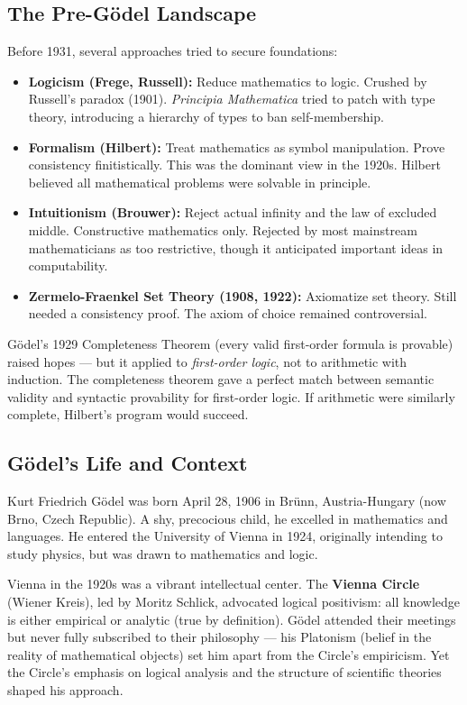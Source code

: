 \subsection*{The Pre-Gödel Landscape}

Before 1931, several approaches tried to secure foundations:

\begin{itemize}
\item \textbf{Logicism (Frege, Russell):} Reduce mathematics to logic. Crushed by Russell's paradox (1901). \emph{Principia Mathematica} tried to patch with type theory, introducing a hierarchy of types to ban self-membership.
\item \textbf{Formalism (Hilbert):} Treat mathematics as symbol manipulation. Prove consistency finitistically. This was the dominant view in the 1920s. Hilbert believed all mathematical problems were solvable in principle.
\item \textbf{Intuitionism (Brouwer):} Reject actual infinity and the law of excluded middle. Constructive mathematics only. Rejected by most mainstream mathematicians as too restrictive, though it anticipated important ideas in computability.
\item \textbf{Zermelo-Fraenkel Set Theory (1908, 1922):} Axiomatize set theory. Still needed a consistency proof. The axiom of choice remained controversial.
\end{itemize}

Gödel's 1929 Completeness Theorem (every valid first-order formula is provable) raised hopes --- but it applied to \emph{first-order logic}, not to arithmetic with induction. The completeness theorem gave a perfect match between semantic validity and syntactic provability for first-order logic. If arithmetic were similarly complete, Hilbert's program would succeed.

\subsection*{Gödel's Life and Context}

Kurt Friedrich Gödel was born April 28, 1906 in Brünn, Austria-Hungary (now Brno, Czech Republic). A shy, precocious child, he excelled in mathematics and languages. He entered the University of Vienna in 1924, originally intending to study physics, but was drawn to mathematics and logic.

Vienna in the 1920s was a vibrant intellectual center. The \textbf{Vienna Circle} (Wiener Kreis), led by Moritz Schlick, advocated logical positivism: all knowledge is either empirical or analytic (true by definition). Gödel attended their meetings but never fully subscribed to their philosophy --- his Platonism (belief in the reality of mathematical objects) set him apart from the Circle's empiricism. Yet the Circle's emphasis on logical analysis and the structure of scientific theories shaped his approach.

